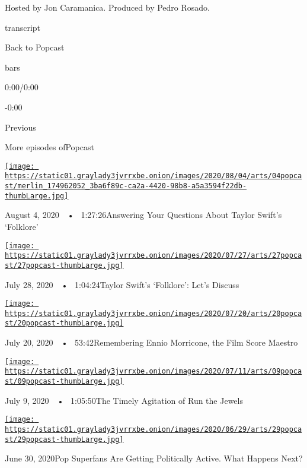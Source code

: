 Hosted by Jon Caramanica. Produced by Pedro Rosado.

transcript

Back to Popcast

bars

0:00/0:00

-0:00

Previous

More episodes ofPopcast

\href{https://www.nytimes3xbfgragh.onion/2020/08/04/arts/music/taylor-swift-folklore-questions.html?action=click\&module=audio-series-bar\&region=header\&pgtype=Article}{\texttt{[image: https://static01.graylady3jvrrxbe.onion/images/2020/08/04/arts/04popcast/merlin\_174962052\_3ba6f89c-ca2a-4420-98b8-a5a3594f22db-thumbLarge.jpg]}}

August 4, 2020~~•~ 1:27:26Answering Your Questions About Taylor Swift's
`Folklore'

\href{https://www.nytimes3xbfgragh.onion/2020/07/27/arts/music/popcast-taylor-swift-folklore.html?action=click\&module=audio-series-bar\&region=header\&pgtype=Article}{\texttt{[image: https://static01.graylady3jvrrxbe.onion/images/2020/07/27/arts/27popcast/27popcast-thumbLarge.jpg]}}

July 28, 2020~~•~ 1:04:24Taylor Swift's `Folklore': Let's Discuss

\href{https://www.nytimes3xbfgragh.onion/2020/07/20/arts/music/popcast-ennio-morricone.html?action=click\&module=audio-series-bar\&region=header\&pgtype=Article}{\texttt{[image: https://static01.graylady3jvrrxbe.onion/images/2020/07/20/arts/20popcast/20popcast-thumbLarge.jpg]}}

July 20, 2020~~•~ 53:42Remembering Ennio Morricone, the Film Score
Maestro

\href{https://www.nytimes3xbfgragh.onion/2020/07/09/arts/music/popcast-run-the-jewels.html?action=click\&module=audio-series-bar\&region=header\&pgtype=Article}{\texttt{[image: https://static01.graylady3jvrrxbe.onion/images/2020/07/11/arts/09popcast/09popcast-thumbLarge.jpg]}}

July 9, 2020~~•~ 1:05:50The Timely Agitation of Run the Jewels

\href{https://www.nytimes3xbfgragh.onion/2020/06/30/arts/music/popcast-superfans-politics.html?action=click\&module=audio-series-bar\&region=header\&pgtype=Article}{\texttt{[image: https://static01.graylady3jvrrxbe.onion/images/2020/06/29/arts/29popcast/29popcast-thumbLarge.jpg]}}

June 30, 2020Pop Superfans Are Getting Politically Active. What Happens
Next?

